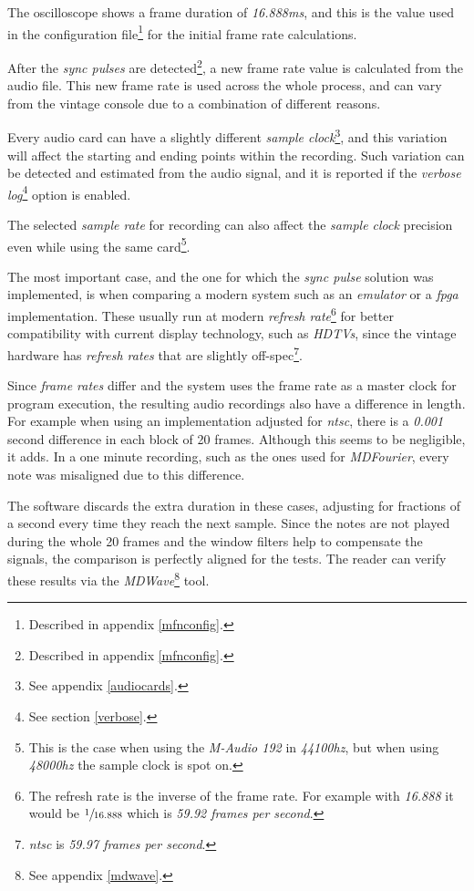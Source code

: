 \documentclass[10pt,a4paper]{report}
\newcommand{\ac}[1]{\textit{\acrshort{#1}}}
\newcommand{\hz}[1]{\textit{#1\acrshort{hz}}}
\begin{document}
\begin{appendices}
The oscilloscope shows a frame duration of \textit{16.888}\ac{ms}, and this is the value used in the configuration file\footnote{Described in appendix \ref{mfnconfig}.} for the initial frame rate calculations.

After the \textit{sync pulses} are detected\footnote{Described in appendix \ref{mfnconfig}.}, a new frame rate value is calculated from the audio file. This new frame rate is used across the whole process, and can vary from the vintage console due to a combination of different reasons.

Every audio card can have a slightly different \textit{sample clock}\footnote{See appendix \ref{audiocards}.}, and this variation will affect the starting and ending points within the recording. Such variation can be detected and estimated from the audio signal, and it is reported if the \textit{verbose log}\footnote{See section \ref{verbose}.} option is enabled.

The selected \textit{sample rate} for recording can also affect the \textit{sample clock} precision even while using the same card\footnote{This is the case when using the \textit{M-Audio 192} \cite{maudio} in \hz{44100}, but when using \hz{48000} the sample clock is spot on.}.

The most important case, and the one for which the \textit{sync pulse} solution was implemented, is when comparing a modern system such as an \textit{emulator} or a \ac{fpga} implementation. These usually run at modern \textit{refresh rate}\footnote{The refresh rate is the inverse of the frame rate. For example with \textit{16.888} it would be $\sfrac{1}{16.888}$ which is \textit{59.92 frames per second}.} for better compatibility with current display technology, such as \textit{HDTVs}, since the vintage hardware has \textit{refresh rates} that are slightly off-spec\footnote{\ac{ntsc} is \textit{59.97 frames per second}.}.

Since \textit{frame rates} differ and the system uses the frame rate as a master clock for program execution, the resulting audio recordings also have a difference in length. For example when using an implementation adjusted for \ac{ntsc}, there is a \textit{0.001} second difference in each block of 20 frames. Although this seems to be negligible, it adds. In a one minute recording, such as the ones used for \textit{MDFourier}, every note was misaligned due to this difference.

The software discards the extra duration in these cases, adjusting for fractions of a second every time they reach the next sample. Since the notes are not played during the whole 20 frames and the window filters help to compensate the signals, the comparison is perfectly aligned for the tests. The reader can verify these results via the \textit{MDWave}\footnote{See appendix \ref{mdwave}.} tool.


\end{appendices}
\end{document}
